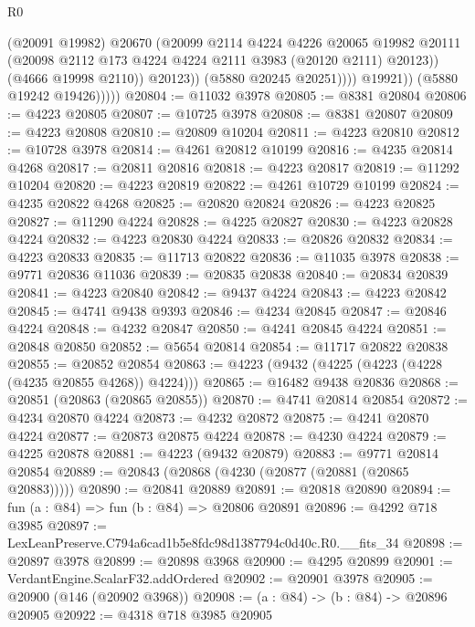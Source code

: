 \begin{lexlean}{R0}
\begin{coremodule}
                            (@20091 @19982)
                            @20670
                            (@20099
                              @2114
                              @4224
                              @4226
                              @20065
                              @19982
                              @20111
                              (@20098 @2112 @173 @4224 @4224 @2111 @3983 (@20120 @2111) @20123))
                            (@4666 @19998 @2110))
                          @20123))
                      (@5880 @20245 @20251))))
                @19921))
            (@5880 @19242 @19426)))))
@20804 := @11032 @3978
@20805 := @8381 @20804
@20806 := @4223 @20805
@20807 := @10725 @3978
@20808 := @8381 @20807
@20809 := @4223 @20808
@20810 := @20809 @10204
@20811 := @4223 @20810
@20812 := @10728 @3978
@20814 := @4261 @20812 @10199
@20816 := @4235 @20814 @4268
@20817 := @20811 @20816
@20818 := @4223 @20817
@20819 := @11292 @10204
@20820 := @4223 @20819
@20822 := @4261 @10729 @10199
@20824 := @4235 @20822 @4268
@20825 := @20820 @20824
@20826 := @4223 @20825
@20827 := @11290 @4224
@20828 := @4225 @20827
@20830 := @4223 @20828 @4224
@20832 := @4223 @20830 @4224
@20833 := @20826 @20832
@20834 := @4223 @20833
@20835 := @11713 @20822
@20836 := @11035 @3978
@20838 := @9771 @20836 @11036
@20839 := @20835 @20838
@20840 := @20834 @20839
@20841 := @4223 @20840
@20842 := @9437 @4224
@20843 := @4223 @20842
@20845 := @4741 @9438 @9393
@20846 := @4234 @20845
@20847 := @20846 @4224
@20848 := @4232 @20847
@20850 := @4241 @20845 @4224
@20851 := @20848 @20850
@20852 := @5654 @20814
@20854 := @11717 @20822 @20838
@20855 := @20852 @20854
@20863 := @4223 (@9432 (@4225 (@4223 (@4228 (@4235 @20855 @4268)) @4224)))
@20865 := @16482 @9438 @20836
@20868 := @20851 (@20863 (@20865 @20855))
@20870 := @4741 @20814 @20854
@20872 := @4234 @20870 @4224
@20873 := @4232 @20872
@20875 := @4241 @20870 @4224
@20877 := @20873 @20875 @4224
@20878 := @4230 @4224
@20879 := @4225 @20878
@20881 := @4223 (@9432 @20879)
@20883 := @9771 @20814 @20854
@20889 := @20843 (@20868 (@4230 (@20877 (@20881 (@20865 @20883)))))
@20890 := @20841 @20889
@20891 := @20818 @20890
@20894 := fun (a : @84) => fun (b : @84) => @20806 @20891
@20896 := @4292 @718 @3985
@20897 := LexLeanPreserve.C794a6cad1b5e8fdc98d1387794c0d40c.R0.__fits_34
@20898 := @20897 @3978
@20899 := @20898 @3968
@20900 := @4295 @20899
@20901 := VerdantEngine.ScalarF32.addOrdered
@20902 := @20901 @3978
@20905 := @20900 (@146 (@20902 @3968))
@20908 := (a : @84) -> (b : @84) -> @20896 @20905
@20922 := @4318
    @718
    @3985
    @20905

\end{coremodule}
\end{lexlean}
